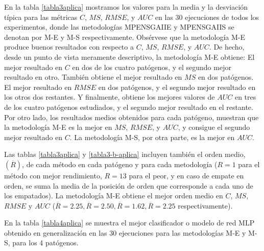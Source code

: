 En la tabla \ref{tabla3aplica} mostramos los valores para la media y la desviación típica
para las métricas $C$, $MS$, $RMSE$, y $AUC$ en las 30 ejecuciones de todos los experimentos, donde
las metodologías MPENSGAIIE y MPENSGAIIS se denotan por M-E y M-S
respectivamente. Obsérvese que la metodología M-E produce buenos resultados con
respecto a $C$, $MS$, $RMSE$, y $AUC$. De hecho, desde un punto de vista meramente
descriptivo, la metodología M-E obtiene: El mejor resultado en $C$ en dos de los cuatro
patógenos, y el segundo mejor resultado en otro. También obtiene el mejor resultado en
$MS$ en dos patógenos. El mejor resultado en $RMSE$ en dos patógenos, y el segundo mejor
resultado en los otros dos restantes. Y finalmente, obtiene los mejores valores de $AUC$
en tres de los cuatro patógenos estudiados, y el segundo mejor resultado en el
restante. Por otro lado, los resultados medios obtenidos para cada patógeno, muestran que
la metodología M-E es la mejor en $MS$, $RMSE$, y $AUC$, y consigue el segundo mejor
resultado en $C$. La metodología M-S, por otra parte, es la mejor en $AUC$.

Las tablas \ref{tabla3aplica} y \ref{tabla3-b-aplica} incluyen
también el orden medio, $(\overline{R})$, de cada método en cada patógeno y para cada
metodología
($R=1$ para el método con mejor rendimiento, $R=13$ para el peor, y en caso de empate en orden, se
suma la media de la posición de orden que corresponde a cada uno de los empatados). La metodología
M-E obtiene el mejor orden medio en $C$,
$MS$, $RMSE$ y $AUC$ ($\overline{R}=2.25, \overline{R}=2.50, \overline{R}=
1.62, \overline{R}=2.25$ respectivamente).

En la tabla \ref{tabla4aplica} se muestra el
mejor clasificador o modelo de red MLP obtenido en generalización en las 30 ejecuciones para las
metodologías M-E y M-S, para los 4 patógenos.

